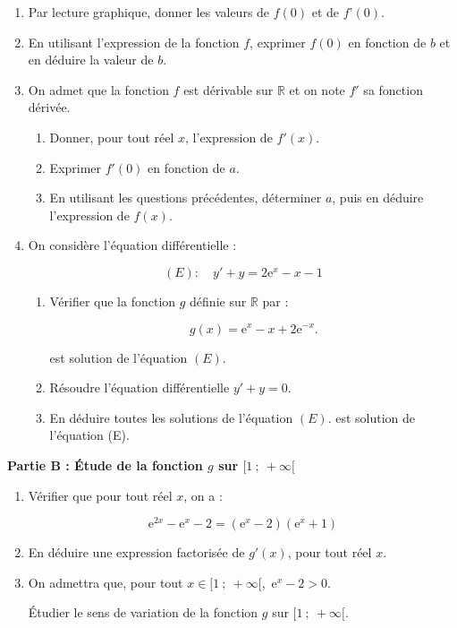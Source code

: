 \documentclass[10pt]{article}
\providecommand{\R}{\mathbb{R}}
\providecommand{\e}{{\mathrm{e}}}
\begin{document}
\begin{enumerate}
\item Par lecture graphique, donner les valeurs de $f(0)$ et de $f’(0)$.
\item En utilisant l'expression de la fonction $f$, exprimer $f(0)$ en fonction de $b$ et en déduire la valeur de $b$.
\item On admet que la fonction $f$ est dérivable sur $\R$ et on note $f'$ sa fonction dérivée. 
	\begin{enumerate}
		\item Donner, pour tout réel $x$, l'expression de $f'(x)$.
		\item Exprimer $f'(0)$ en fonction de $a$.
		\item En utilisant les questions précédentes, déterminer $a$, puis en déduire l'expression de $f(x)$.
	\end{enumerate}
\item On considère l'équation différentielle :

\[(E):\quad  y' +y =2\e^x - x - 1\]

	\begin{enumerate}
		\item Vérifier que la fonction $g$ définie sur $\R$ par :
		
\[g(x) = \e^x - x + 2\e^{-x}.\]

est solution de l'équation $(E)$.
		\item Résoudre l'équation différentielle $y' + y = 0$.
		\item En déduire toutes les solutions de l'équation $(E)$. 
est solution de l'équation (E).
	\end{enumerate}
\end{enumerate}

\bigskip

\textbf{Partie B : Étude de la fonction $g$ sur $[1~;~+\infty[$}

\medskip

\begin{enumerate}
\item Vérifier que pour tout réel $x$, on a :

\[\e^{2x} - \e^x - 2 = \left(\e^x - 2\right)\left(\e^x + 1\right)\]

\item En déduire une expression factorisée de $g'(x)$, pour tout réel $x$.
\item On admettra que, pour tout $x \in  [1~;~ +\infty[$,\, $\e^x - 2 > 0$.

 Étudier le sens de variation de la fonction $g$ sur $[1~;~ +\infty[$.
\end{enumerate}
\end{document}
